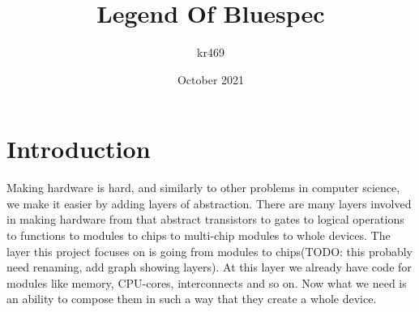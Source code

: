 \documentclass[14pt]{report}
\title{Legend Of Bluespec}
\author{kr469 }
\date{October 2021}
\begin{document}
\maketitle
\tableofcontents

\chapter{Introduction}

Making hardware is hard, and similarly to other problems in computer science, we make it easier by adding layers of abstraction. There are many layers involved in making hardware from that abstract transistors to gates to logical operations to functions to modules to chips to multi-chip modules to whole devices. The layer this project focuses on is going from modules to chips(TODO: this probably need renaming, add graph showing layers). At this layer we already have code for modules like memory, CPU-cores, interconnects and so on. Now what we need is an ability to compose them in such a way that they create a whole device.
\end{document}
